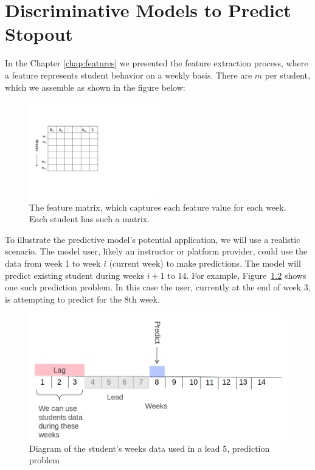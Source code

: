 \chapter{Discriminative Models to Predict Stopout} \label{chap:logreg}

In the Chapter \ref{chap:features} we presented the feature extraction process, where a feature represents student behavior on a weekly basis. There are $m$ \feat per student, which we assemble as shown in the figure below: 

\begin{figure}[ht!]
  \caption{The feature matrix, which captures each feature value for each week. Each student has such a matrix.}\label{fig:student_weekly_features}
  \centering
    \includegraphics[width=0.5\textwidth]{figures/student_week_matrix}
\end{figure}

To illustrate the predictive model's potential application, we will use a realistic scenario. The model user, likely an instructor or platform provider, could use the data from week 1 to week $i$ (current week) to make predictions. The model will predict existing student \sti during weeks $i+1$ to $14$. For example, Figure~\ref{fig:lead_lag2} shows one such prediction problem. In this case the user, currently at the end of week 3, is attempting to predict \sti for the 8th week. 
\begin{figure}[!ht]
  \caption{Diagram of the student's weeks data used in a lead 5,  prediction problem}\label{fig:lead_lag2}
  \centering
    \includegraphics[width=1.0\textwidth]{figures/lead_lag.png}
\end{figure}

